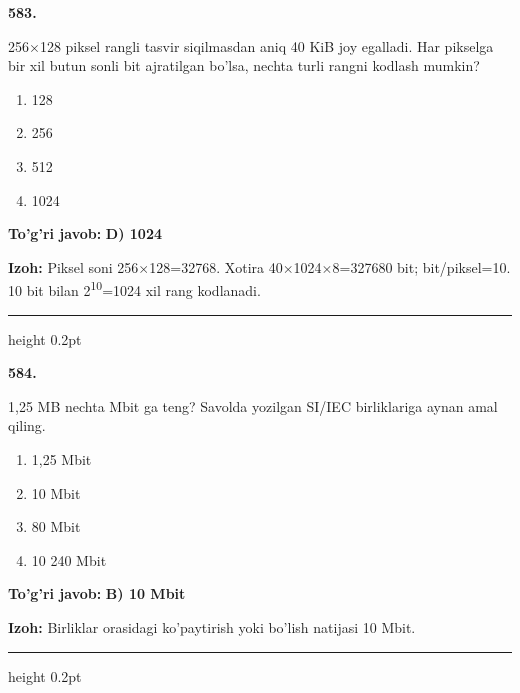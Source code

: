 \documentclass[10pt,a4paper,oneside]{article}
\begin{document}
\noindent\textbf{\color{ink}583.}
\par
256\ensuremath{\times}128 piksel rangli tasvir siqilmasdan aniq 40 KiB joy egalladi. Har pikselga bir xil butun sonli bit ajratilgan bo'lsa, nechta turli rangni kodlash mumkin?
\begin{enumerate}[label=\Alph*),leftmargin=9mm]
\item 128
\item 256
\item 512
\item 1024
\end{enumerate}
\begin{tcolorbox}[enhanced,breakable,colback=teal!4,colframe=teal!50!black,boxrule=0.5pt,arc=1.1mm,left=3mm,right=3mm,top=1.7mm,bottom=1.7mm,before skip=2mm,after skip=2mm]
\textbf{\color{teal}To'g'ri javob:} \textbf{D) 1024}
\par\smallskip
\textbf{Izoh:} Piksel soni 256\ensuremath{\times}128=32768. Xotira 40\ensuremath{\times}1024\ensuremath{\times}8=327680 bit; bit/piksel=10. 10 bit bilan 2\textsuperscript{1}\textsuperscript{0}=1024 xil rang kodlanadi.
\end{tcolorbox}
\vspace{2mm}\hrule height 0.2pt \vspace{3mm}

\noindent\textbf{\color{ink}584.}
\par
1,25 MB nechta Mbit ga teng? Savolda yozilgan SI/IEC birliklariga aynan amal qiling.
\begin{enumerate}[label=\Alph*),leftmargin=9mm]
\item 1,25 Mbit
\item 10 Mbit
\item 80 Mbit
\item 10 240 Mbit
\end{enumerate}
\begin{tcolorbox}[enhanced,breakable,colback=teal!4,colframe=teal!50!black,boxrule=0.5pt,arc=1.1mm,left=3mm,right=3mm,top=1.7mm,bottom=1.7mm,before skip=2mm,after skip=2mm]
\textbf{\color{teal}To'g'ri javob:} \textbf{B) 10 Mbit}
\par\smallskip
\textbf{Izoh:} Birliklar orasidagi ko'paytirish yoki bo'lish natijasi 10 Mbit.
\end{tcolorbox}
\vspace{2mm}\hrule height 0.2pt \vspace{3mm}
\end{document}
